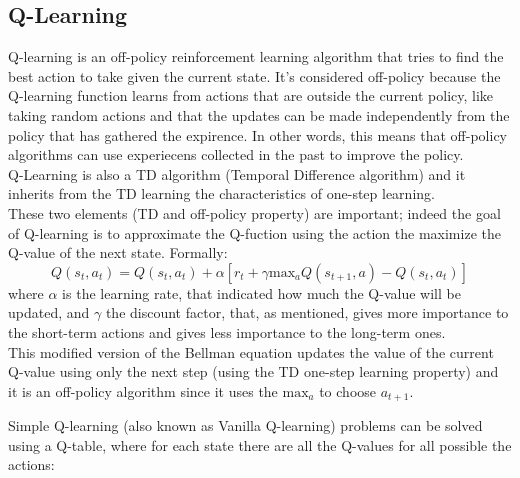 \documentclass[14pt]{extarticle}
\def\sp{\vspace{5pt}}
\def\ppn{\vspace{10pt}}
\begin{document}
\begin{flushleft}
\subsection{Q-Learning}
\sp
Q-learning is an off-policy reinforcement learning algorithm that tries to find the best action to take given the current state. It's considered off-policy because the Q-learning function learns from actions that are outside the current policy, like taking random actions and that the updates can be made independently from the policy that has gathered the expirence. In other words, this means that off-policy algorithms can use experiecens collected in the past to improve the policy.\\
Q-Learning is also a TD algorithm (Temporal Difference algorithm\cite{TDl}) and it inherits from the TD learning the characteristics of one-step learning.\\
These two elements (TD and off-policy property) are important; indeed the goal of Q-learning is to approximate the Q-fuction using the action the maximize the Q-value of the next state. Formally:
\begin{equation} \label{eq:2}
 Q(s_t,a_t) = Q(s_t,a_t) + 
\alpha[r_t + \gamma \text{max}_{a}Q(s_{t+1},a) - Q(s_t,a_t)] 
\end{equation}
where $\alpha$ is the learning rate, that indicated how much the Q-value will be updated, and $\gamma$ the discount factor, that, as mentioned, gives more importance to the short-term actions and gives less importance to the long-term ones. \\
This modified version of the Bellman equation updates the value of the current Q-value using only the next step (using the TD one-step learning property) and it is an off-policy 
algorithm since it uses the $\text{max}_{a}$ to choose $a_{t+1}$.

\ppn
Simple Q-learning (also known as Vanilla Q-learning) problems can be solved using a Q-table, where for each state there are all the Q-values for all possible the actions:


\end{flushleft}
\end{document}
